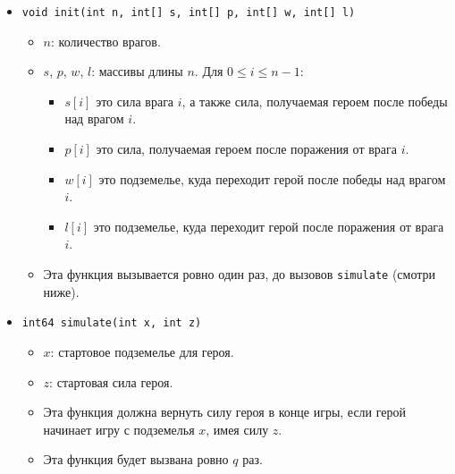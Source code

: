 \begin{itemize}
\item \texttt{void init(int n, int[] s, int[] p, int[] w, int[] l)}
\begin{itemize}
\item $n$: количество врагов.
\item $s$, $p$, $w$, $l$: массивы длины $n$. Для $0 \leq i \leq n-1$:
  \begin{itemize}
  \item $s[i]$ это сила врага $i$, а также сила, получаемая героем после победы над врагом $i$.
  \item $p[i]$ это сила, получаемая героем после поражения от врага $i$.
  \item $w[i]$ это подземелье, куда переходит герой после победы над врагом $i$.
  \item $l[i]$ это подземелье, куда переходит герой после поражения от врага $i$.
\end{itemize}
\item Эта функция вызывается ровно один раз, до вызовов \texttt{simulate} (смотри ниже).
\end{itemize}
\item \texttt{int64 simulate(int x, int z)}
\begin{itemize}
\item $x$: стартовое подземелье для героя.
\item $z$: стартовая сила героя.
\item Эта функция должна вернуть силу героя в конце игры, если герой начинает игру с подземелья $x$, имея силу $z$.
\item Эта функция будет вызвана ровно $q$ раз.
\end{itemize}
\end{itemize}